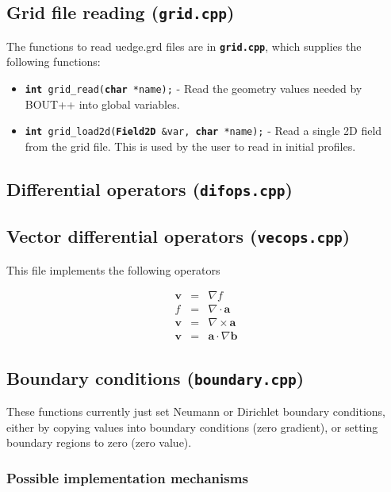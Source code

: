 \documentclass[12pt, a4paper]{article}
\newcommand{\code}[1]{\texttt{#1}}
\newcommand{\file}[1]{\texttt{\bf #1}}
\begin{document}
\subsection{Grid file reading (\file{grid.cpp})}

The functions to read uedge.grd files are in \file{grid.cpp}, which supplies the following
functions:

\begin{itemize}
\item \code{{\bf int} grid\_read({\bf char} *name);} - Read the geometry values
needed by BOUT++ into global variables.
\item \code{{\bf int} grid\_load2d({\bf Field2D} \&var, {\bf char} *name);} - Read
a single 2D field from the grid file. This is used by the user to read in
initial profiles.

\end{itemize}

\subsection{Differential operators (\file{difops.cpp})}



\subsection{Vector differential operators (\file{vecops.cpp})}

This file implements the following operators

\begin{eqnarray*}
\mathbf{v} &=& \nabla f \\
f &=& \nabla\cdot\mathbf{a} \\
\mathbf{v} &=& \nabla\times\mathbf{a} \\
\mathbf{v} &=& \mathbf{a}\cdot\nabla\mathbf{b}
\end{eqnarray*}



\subsection{Boundary conditions (\file{boundary.cpp})}

These functions currently just set Neumann or Dirichlet boundary conditions,
either by copying values into boundary conditions (zero gradient), or
setting boundary regions to zero (zero value).

\subsubsection{Possible implementation mechanisms}
\end{document}
